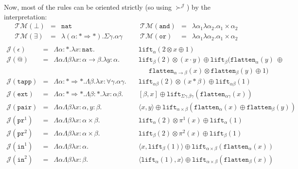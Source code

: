 \documentclass[a4paper,UKenglish,cleveref,autoref,numberwithinsect]{lipics-v2019}
\theoremstyle{definition}
\newcommand{\arrkind}{\Rightarrow}
\newcommand{\arrtype}{\rightarrow}
\newcommand{\quant}[2]{\forall #1.#2}
\newcommand{\pair}[2]{\langle #1,#2 \rangle}
\newcommand{\expair}[2]{[#1,#2]}
\newcommand{\nat}{\mathtt{nat}}
\newcommand{\flatten}{\mathtt{flatten}}
\newcommand{\lift}{\mathtt{lift}}
\newcommand{\Typemap}{\mathcal{T\!M}}
\newcommand{\Termmap}{\mathcal{J}}
\newcommand{\succinterpret}{\succ^{\Termmap}}
\newcommand{\proj}{\mathtt{pr}}
\begin{document}
Now, most of the rules can be oriented strictly (so using $\succinterpret$)
by the interpretation:
\[
\begin{array}{rclcrcl}
\Typemap(\bot) & = & \nat
& \quad &
\Typemap(\mathtt{and}) & = & \lambda\alpha_1\lambda\alpha_2 . \alpha_1\times\alpha_2 \\

\Typemap(\exists) & = & \lambda(\alpha : * \arrkind *) . \Sigma \gamma . \alpha \gamma
& \quad &
\Typemap(\mathtt{or}) & = & \lambda\alpha_1\lambda\alpha_2 . \alpha_1\times\alpha_2 \\
\end{array}
\]
\[
\begin{array}{rcll}
\Termmap(\epsilon) & = & \Lambda \alpha:* . \lambda x:\nat. &
  \mathtt{lift}_\alpha(2 \otimes x \oplus 1) \\
\Termmap(@) & = & \Lambda\alpha\Lambda\beta\lambda x: \alpha \arrtype \beta . \lambda y :
  \alpha . \quad & \lift_\beta(2) \otimes (x \cdot y) \oplus
  \lift_\beta(\flatten_\alpha(y)\ \oplus \\
  & & & \phantom{AB}\flatten_{\alpha \arrtype \beta}(x) \otimes
  \flatten_\beta(y) \oplus 1) \\
\Termmap(\mathtt{tapp}) & = & \Lambda \alpha : * \arrkind * . \Lambda \beta . \lambda x : \quant{\gamma}{\alpha\gamma} . \quad &
  \lift_{\alpha\beta}(2) \otimes
  (x * \beta) \oplus \lift_{\alpha\beta}(1) \\
\Termmap(\mathtt{ext}) & = & \Lambda \alpha : * \arrkind * . \Lambda \beta : * . \lambda x:\alpha\beta . &
  \expair{\beta}{x} \oplus \lift_{\Sigma\gamma.\beta\gamma}(
  \flatten_{\alpha\gamma}(x)) \\
\Termmap(\mathtt{pair}) & = & \Lambda \alpha \Lambda \beta \lambda x :
  \alpha, y : \beta.\quad & \pair{x}{y} \oplus \lift_{
  \alpha \times \beta}(\flatten_\alpha(x) \oplus \flatten_{\beta}(y)) \\
\Termmap(\proj^1) & = & \Lambda \alpha \Lambda \beta \lambda x :
  \alpha \times \beta . \quad
  & \lift_\alpha(2) \otimes \pi^1(x) \oplus \lift_{\alpha}(1) \\
\Termmap(\proj^2) & = & \Lambda \alpha \Lambda \beta \lambda x :
  \alpha\times\beta.\quad
  & \lift_\beta(2) \otimes \pi^2(x) \oplus \lift_{\beta}(1) \\
\Termmap(\mathtt{in}^1) & = & \Lambda \alpha \Lambda \beta
  \lambda x : \alpha.\quad & \pair{x}{\lift_\beta(1)}
  \oplus \lift_{\alpha
  \times \beta}(\flatten_{\alpha}(x)) \\
\Termmap(\mathtt{in}^2) & = & \Lambda \alpha \Lambda \beta
  \lambda x : \beta.\quad & \pair{\lift_\alpha(1)}{x}
  \oplus \lift_{\alpha \times \beta}(\flatten_{\beta}(x)) \\
\end{array}
\]
\end{document}
